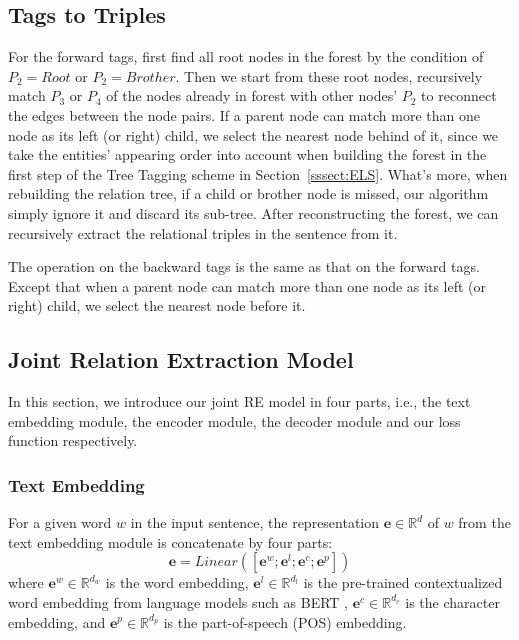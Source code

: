 \documentclass[conference]{IEEEtran}
\begin{document}
\subsection{Tags to Triples}
For the forward tags, first find all root nodes in the forest by the condition of $P_2 = Root$ or $P_2 = Brother$. Then we start from these root nodes, recursively match $P_3$ or $P_4$ of the nodes already in forest with other nodes' $P_2$ to reconnect the edges between the node pairs. If a parent node can match more than one node as its left (or right) child, we select the nearest node behind of it, since we take the entities’ appearing order into account when building the forest in the first step of the Tree Tagging scheme in Section~\ref{sssect:ELS}. What’s more, when rebuilding the relation tree, if a child or brother node is missed, our algorithm simply ignore it and discard its sub-tree. After reconstructing the forest, we can recursively extract the relational triples in the sentence from it.

The operation on the backward tags is the same as that on the forward tags. Except that when a parent node can match more than one node as its left (or right) child, we select the nearest node before it.

\subsection{Joint Relation Extraction Model}
\label{ssec:model}



In this section, we introduce our joint RE model in four parts, i.e., the text embedding module, the encoder module, the decoder module and our loss function respectively.

\subsubsection{Text Embedding}
For a given word $w$ in the input sentence, the representation $\boldsymbol{e} \in \mathbb{R}^{d}$ of $w$ from the text embedding module is concatenate by four parts:
\begin{equation}\label{equa:Embedding}
    \boldsymbol{e} = Linear([\boldsymbol{e}^w; \boldsymbol{e}^l; \boldsymbol{e}^c; \boldsymbol{e}^p])
\end{equation}
where $\boldsymbol{e}^w \in \mathbb{R}^{d_w}$ is the word embedding, $\boldsymbol{e}^l \in \mathbb{R}^{d_l}$ is the pre-trained contextualized word embedding from language models such as BERT \cite{Devlin2019BERT}, $\boldsymbol{e}^c \in \mathbb{R}^{d_c}$ is the character embedding, and $\boldsymbol{e}^p \in \mathbb{R}^{d_p}$ is the part-of-speech (POS) embedding.
\end{document}
